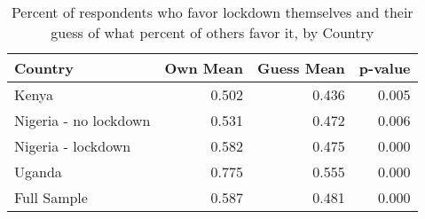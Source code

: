 \begin{table}[ht]
\centering
\caption{Percent of respondents who favor lockdown themselves and their guess of what percent of others favor it, by Country} 
\label{tab:fig2}
\begin{tabular}{lrrr}
  \hline
Country & Own Mean & Guess Mean & p-value \\ 
  \hline
Kenya & 0.502 & 0.436 & 0.005 \\ 
  Nigeria - no lockdown & 0.531 & 0.472 & 0.006 \\ 
  Nigeria - lockdown & 0.582 & 0.475 & 0.000 \\ 
  Uganda & 0.775 & 0.555 & 0.000 \\ 
  Full Sample & 0.587 & 0.481 & 0.000 \\ 
   \hline
\end{tabular}
\end{table}

